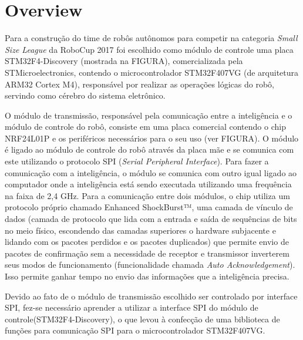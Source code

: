 \chapter{Overview}\label{cap:overview}

Para a construção do time de robôs autônomos para competir na categoria \textit{Small Size League}  da RoboCup 2017 foi escolhido como módulo de controle uma placa STM32F4-Discovery (mostrada na FIGURA), comercializada pela STMicroelectronics, contendo o microcontrolador STM32F407VG (de arquitetura ARM32 Cortex M4), responsável por realizar as operações lógicas do robô, servindo como cérebro do sistema eletrônico.

O módulo de transmissão, responsável pela comunicação entre a inteligência e o módulo de controle do robô, consiste em uma placa comercial contendo o chip NRF24L01P e os periféricos necessários para o seu uso (ver FIGURA). O módulo é ligado ao módulo de controle do robô através da placa mãe e se comunica com este utilizando o protocolo SPI (\textit{Serial Peripheral Interface}). Para fazer a comunicação com a inteligência, o módulo se comunica com outro igual ligado ao computador onde a inteligência está sendo executada utilizando uma frequência na faixa de 2,4 GHz. Para a comunicação entre dois módulos, o chip utiliza um protocolo próprio chamado Enhanced ShockBurst™, uma camada de vínculo de dados (camada de protocolo que lida com a entrada e saída de sequências de bits no meio físico, escondendo das camadas superiores o hardware subjacente e lidando com os pacotes perdidos e os pacotes duplicados) que permite envio de pacotes de confirmação sem a necessidade de receptor e transmissor inverterem seus modos de funcionamento (funcionalidade chamada \textit{Auto Acknowledgement}).
Isso permite ganhar tempo no envio das informações que a inteligência precisa.

Devido ao fato de o módulo de transmissão escolhido ser controlado por interface SPI, fez-se necessário aprender a utilizar a interface SPI do módulo de controle(STM32F4-Discovery), o que levou à confecção de uma  biblioteca de funções para comunicação SPI para o microcontrolador STM32F407VG.


